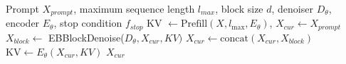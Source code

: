 \begin{algorithm}
\caption{DiffusionGemma Block Autoregressive}
\label{alg:block-ar}
\begin{algorithmic}[1] %
    \REQUIRE Prompt $X_{prompt}$, maximum sequence length $l_{max}$, block size $d$, denoiser $D_{\theta}$, encoder $E_{\theta}$, stop condition $f_{stop}$
    \STATE KV $\gets \text{Prefill}(X, l_{\max}, E_{\theta})$, $X_{cur} \gets X_{prompt}$
        \STATE $X_{block} \gets $ EBBlockDenoise($D_{\theta}, X_{cur}, KV)$
        \STATE $X_{cur} \gets \text{concat}(X_{cur}, X_{block})$
        \STATE $\text{KV} \gets E_{\theta}(X_{cur}, KV)$
    \ENDWHILE
    \RETURN $X_{cur}$
\end{algorithmic}
\end{algorithm}